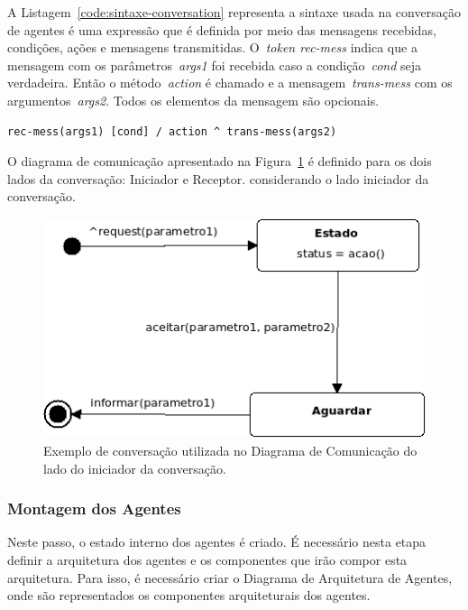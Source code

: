A Listagem~\ref{code:sintaxe-conversation} representa a sintaxe usada na conversação de agentes é uma expressão que é definida por meio das mensagens recebidas, condições, ações e mensagens transmitidas. O~\emph{token rec-mess} indica que a mensagem com os parâmetros~\emph{args1} foi recebida caso a condição~\emph{cond} seja verdadeira. Então o método~\emph{action} é chamado e a mensagem~\emph{trans-mess} com os argumentos~\emph{args2}. Todos os elementos da mensagem são opcionais.

\begin{lstlisting}[label=code:sintaxe-conversation,caption=Sintaxe da conversação entre dois agentes.]
	rec-mess(args1) [cond] / action ^ trans-mess(args2)
\end{lstlisting}

O diagrama de comunicação apresentado na Figura~\ref{fig:exemplo-conversation} é definido para os dois lados da conversação: Iniciador e Receptor. considerando o lado iniciador da conversação.

\begin{figure}
	\centering
	\includegraphics[scale=0.65]{images/exemplo-conversation.png}
	\caption{Exemplo de conversação utilizada no Diagrama de Comunicação do lado do iniciador da conversação.}
	\label{fig:exemplo-conversation}
\end{figure}

\subsubsection{Montagem dos Agentes}

Neste passo, o estado interno dos agentes é criado. É necessário nesta etapa definir a arquitetura dos agentes e os componentes que irão compor esta arquitetura. Para isso, é necessário criar o Diagrama de Arquitetura de Agentes, onde são representados os componentes arquiteturais dos agentes.

